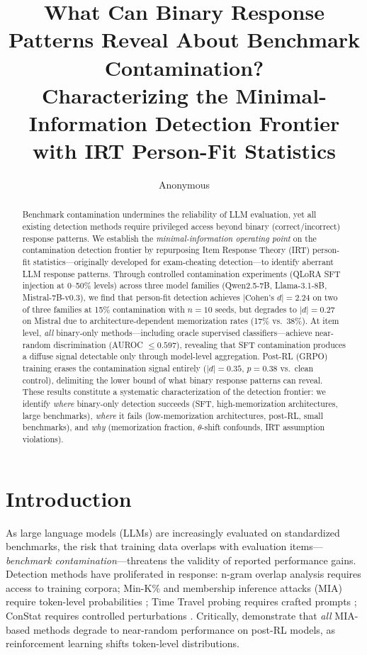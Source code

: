 \documentclass[11pt,a4paper]{article}
\title{What Can Binary Response Patterns Reveal About Benchmark Contamination?\\
\large Characterizing the Minimal-Information Detection Frontier\\with IRT Person-Fit Statistics}
\author{Anonymous}
\date{}
\begin{document}
\maketitle

\begin{abstract}
Benchmark contamination undermines the reliability of LLM evaluation, yet all existing detection methods require privileged access beyond binary (correct/incorrect) response patterns.
We establish the \emph{minimal-information operating point} on the contamination detection frontier by repurposing Item Response Theory (IRT) person-fit statistics---originally developed for exam-cheating detection---to identify aberrant LLM response patterns.
Through controlled contamination experiments (QLoRA SFT injection at 0--50\% levels) across three model families (Qwen2.5-7B, Llama-3.1-8B, Mistral-7B-v0.3), we find that person-fit detection achieves $|\text{Cohen's } d| = 2.24$ on two of three families at 15\% contamination with $n=10$ seeds, but degrades to $|d|=0.27$ on Mistral due to architecture-dependent memorization rates (17\% vs.\ 38\%).
At item level, \emph{all} binary-only methods---including oracle supervised classifiers---achieve near-random discrimination (AUROC $\leq 0.597$), revealing that SFT contamination produces a diffuse signal detectable only through model-level aggregation.
Post-RL (GRPO) training erases the contamination signal entirely ($|d|=0.35$, $p=0.38$ vs.\ clean control), delimiting the lower bound of what binary response patterns can reveal.
These results constitute a systematic characterization of the detection frontier: we identify \emph{where} binary-only detection succeeds (SFT, high-memorization architectures, large benchmarks), \emph{where} it fails (low-memorization architectures, post-RL, small benchmarks), and \emph{why} (memorization fraction, $\theta$-shift confounds, IRT assumption violations).
\end{abstract}

\section{Introduction}
\label{sec:intro}

As large language models (LLMs) are increasingly evaluated on standardized benchmarks, the risk that training data overlaps with evaluation items---\emph{benchmark contamination}---threatens the validity of reported performance gains.
Detection methods have proliferated in response: n-gram overlap analysis requires access to training corpora; Min-K\% and membership inference attacks (MIA) require token-level probabilities \citep{shi2024detecting}; Time Travel probing requires crafted prompts \citep{dekoninck2024evading}; ConStat requires controlled perturbations \citep{dekoninck2024constat}.
Critically, \citet{wang2025rlmia} demonstrate that \emph{all} MIA-based methods degrade to near-random performance on post-RL models, as reinforcement learning shifts token-level distributions.
\end{document}
